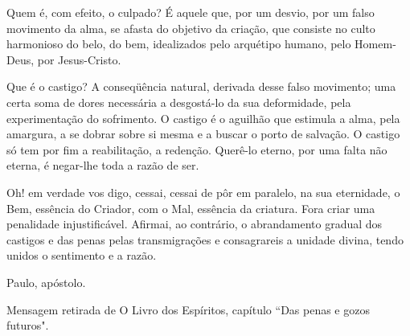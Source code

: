 \emdash{}Quem é, com efeito, o culpado? É aquele que, por um
desvio, por um falso movimento da alma, se afasta do objetivo da criação, que consiste no culto harmonioso do belo,
do bem, idealizados pelo arquétipo humano, pelo Homem-Deus, por Jesus-Cristo.

\emdash{}Que é o castigo? A conseqüência natural, derivada
desse falso movimento; uma certa soma de dores necessária a desgostá-lo da sua deformidade, pela experimentação
do sofrimento. O castigo é o aguilhão que estimula a alma,
pela amargura, a se dobrar sobre si mesma e a buscar o
porto de salvação. O castigo só tem por fim a reabilitação, a
redenção. Querê-lo eterno, por uma falta não eterna, é
negar-lhe toda a razão de ser.

\emdash{}Oh! em verdade vos digo, cessai, cessai de pôr em paralelo, na sua eternidade, o Bem, essência do Criador, com
o Mal, essência da criatura. Fora criar uma penalidade
injustificável. Afirmai, ao contrário, o abrandamento gradual dos castigos e das penas pelas transmigrações e
consagrareis a unidade divina, tendo unidos o sentimento
e a razão.

\emdash{}Paulo, apóstolo.

\emdash{}Mensagem retirada de O Livro dos Espíritos, capítulo ``Das penas e gozos futuros".